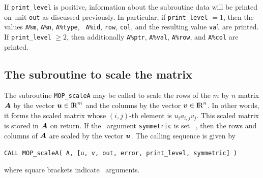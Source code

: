 \documentclass{galahad}
\newcommand{\packagename}{MOP}
\begin{document}
If {\tt print\_level} is positive, information about the subroutine
data will be printed on unit {\tt out} as discussed
previously.  In particular, if {\tt print\_level} $= 1$, then the
values {\tt A\%m}, {\tt A\%n}, {\tt A\%type}, {\tt
  A\%id}, {\tt row}, {\tt col}, and the resulting value {\tt val} are
printed.  If {\tt print\_level} $\geq 2$, then
additionally {\tt A\%ptr}, {\tt A\%val}, {\tt A\%row},
and {\tt A\%col} are printed.


\subsection{The subroutine to scale the matrix}\label{scaleA}

The subroutine {\tt \packagename\_scaleA} may be called to scale the
rows of the $m$ by $n$ matrix ${\bm{A}}$ by the vector ${\bm{u}}\in\hbox{I\hskip -1.5pt R}^m$
and the columns by the vector ${\bm{v}}\in\hbox{I\hskip -1.5pt R}^n$.  In other words, it
forms the scaled matrix whose $(i,j)$-th element is $u_ia_{i,j}v_j$.
This scaled matrix is stored in ${\bm{A}}$ on return.  If the \optional\
argument {\tt symmetric} is set \true\ , then the rows and columns of
${\bm{A}}$ are scaled by the vector ${\bm{u}}$.  The calling
sequence is given by \vspace*{1mm}

\hspace{8mm}
{\tt CALL \packagename\_scaleA( A, [u, v, out, error,
                                print\_level, symmetric] )}

\vspace*{1mm}
\noindent where square brackets indicate \optional\ arguments. 
\end{document}
